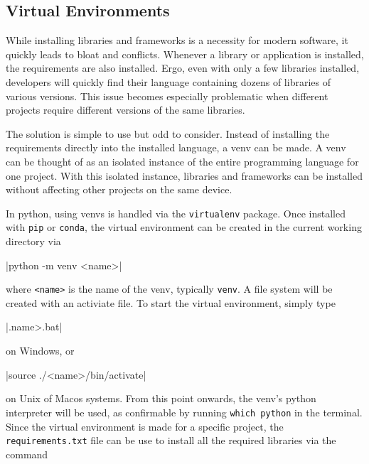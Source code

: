 \documentclass[11pt]{article}
\begin{document}
\inputminted[linenos=true]{python}{python_examples/requirements_example.txt}

\subsection{Virtual Environments}

While installing libraries and \glspl{framework} is a necessity for modern software, it quickly leads to bloat and conflicts. Whenever a \gls{library} or application is installed, the requirements are also installed. Ergo, even with only a few libraries installed, developers will quickly find their language containing dozens of libraries of various versions. This issue becomes especially problematic when different projects require different versions of the same libraries.

The solution is simple to use but odd to consider. Instead of installing the requirements directly into the installed language, a \gls{venv} can be made. A \gls{venv} can be thought of as an isolated instance of the entire programming language for one project. With this isolated instance, libraries and \glspl{framework} can be installed without affecting other projects on the same device.

In \Gls{python}, using \glspl{venv} is handled via the \texttt{virtualenv} package. Once installed with \texttt{pip} or \texttt{conda}, the virtual environment can be created in the current working directory via

|python -m venv <name>|

\noindent
where \texttt{<name>} is the name of the \gls{venv}, typically \texttt{venv}. A file system will be created with an activiate file. To start the virtual environment, simply type

|.\<name>\Scripts\activate.bat|

\noindent
on Windows, or

|source ./<name>/bin/activate|

\noindent
on Unix of Mac\acrshort{os} systems. From this point onwards, the \gls{venv}'s \Gls{python} interpreter will be used, as confirmable by running \texttt{which python} in the terminal. Since the virtual environment is made for a specific project, the \texttt{requirements.txt} file can be use to install all the required libraries via the command
\end{document}
